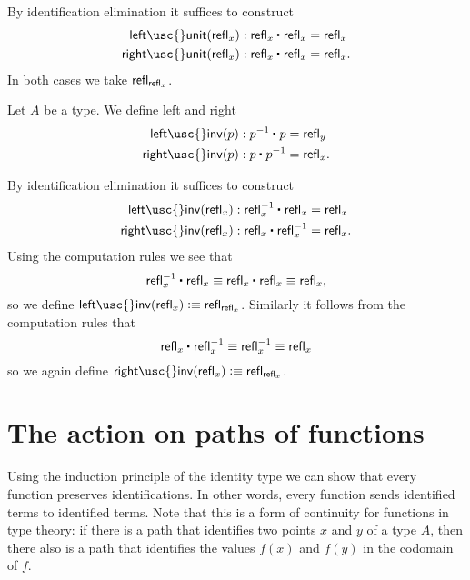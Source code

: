 \begin{constr}
By identification elimination it suffices to construct
\begin{align*}
\mathsf{left\usc{}unit}(\refl{x}) & : \ct{\refl{x}}{\refl{x}} = \refl{x} \\
\mathsf{right\usc{}unit}(\refl{x}) & : \ct{\refl{x}}{\refl{x}} = \refl{x}.
\end{align*}
In both cases we take $\mathsf{refl}_{\mathsf{refl}_{x}}$.
\end{constr}

\begin{defn}\label{defn:id_invlaw}
Let $A$ be a type. We define left and right 
\begin{align*}
\mathsf{left\usc{}inv}(p) & : \ct{p^{-1}}{p} = \refl{y} \\
\mathsf{right\usc{}inv}(p) & : \ct{p}{p^{-1}} = \refl{x}.
\end{align*}
\end{defn}

\begin{constr}
By identification elimination it suffices to construct
\begin{align*}
\mathsf{left\usc{}inv}(\refl{x}) & : \ct{\refl{x}^{-1}}{\refl{x}} = \refl{x} \\
\mathsf{right\usc{}inv}(\refl{x}) & : \ct{\refl{x}}{\refl{x}^{-1}} = \refl{x}.
\end{align*}
Using the computation rules we see that
\begin{equation*}
\ct{\refl{x}^{-1}}{\refl{x}}\jdeq \ct{\refl{x}}{\refl{x}}\jdeq\refl{x},
\end{equation*}
so we define $\mathsf{left\usc{}inv}(\refl{x})\defeq \refl{\refl{x}}$. Similarly it follows from the computation rules that
\begin{equation*}
\ct{\refl{x}}{\refl{x}^{-1}} \jdeq \refl{x}^{-1}\jdeq \refl{x}
\end{equation*}
so we again define $\mathsf{right\usc{}inv}(\refl{x})\defeq\refl{\refl{x}}$. 
\end{constr}

\section{The action on paths of functions}

Using the induction principle of the identity type we can show that every function preserves identifications.
In other words, every function sends identified terms to identified terms.
Note that this is a form of continuity for functions in type theory: if there is a path that identifies two points $x$ and $y$ of a type $A$, then there also is a path that identifies the values $f(x)$ and $f(y)$ in the codomain of $f$. 

